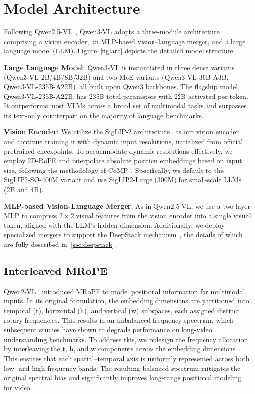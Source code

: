 \documentclass{article} %
\begin{document}
\section{Model Architecture}
Following Qwen2.5-VL~\citep{qwen2.5vl}, Qwen3-VL adopts a three-module architecture comprising a vision encoder, an MLP-based vision–language merger, and a large language model (LLM). Figure~\ref{fig:arc} depicts the detailed model structure.

\textbf{Large Language Model}: 
Qwen3-VL is instantiated in three dense variants (Qwen3-VL-2B/4B/8B/32B) and two MoE variants (Qwen3-VL-30B-A3B, Qwen3-VL-235B-A22B), all built upon Qwen3 backbones. The flagship model, Qwen3-VL-235B-A22B, has 235B total parameters with 22B activated per token. It outperforms most VLMs across a broad set of multimodal tasks and surpasses its text-only counterpart on the majority of language benchmarks.

\textbf{Vision Encoder}: 
We utilize the SigLIP-2 architecture~\citep{tschannen2025siglip} as our vision encoder and continue training it with dynamic input resolutions, initialized from official pretrained checkpoints. To accommodate dynamic resolutions effectively, we employ 2D-RoPE and interpolate absolute position embeddings based on input size, following the methodology of CoMP~\citep{chen2025comp}.
Specifically, we default to the SigLIP2-SO-400M variant and use SigLIP2-Large (300M) for small-scale LLMs (2B and 4B).


\textbf{MLP-based Vision-Language Merger}: 
As in Qwen2.5-VL, we use a two-layer MLP to compress $2\times2$ visual features from the vision encoder into a single visual token, aligned with the LLM’s hidden dimension. Additionally, we deploy specialized mergers to support the DeepStack mechanism~\citep{meng2024deepstack}, the details of which are fully described in~\cref{sec:deepstack}.

\subsection{Interleaved MRoPE}
Qwen2-VL~\citep{Qwen2-VL} introduced MRoPE to model positional information for multimodal inputs. In its original formulation, the embedding dimensions are partitioned into temporal (t), horizontal (h), and vertical (w) subspaces, each assigned distinct rotary frequencies. This results in an imbalanced frequency spectrum, which subsequent studies have shown to degrade performance on long-video understanding benchmarks.
To address this, we redesign the frequency allocation by interleaving the t, h, and w components across the embedding dimensions~\citep{interleave-mrope}. This ensures that each spatial–temporal axis is uniformly represented across both low- and high-frequency bands. The resulting balanced spectrum mitigates the original spectral bias and significantly improves long-range positional modeling for video.
\end{document}
